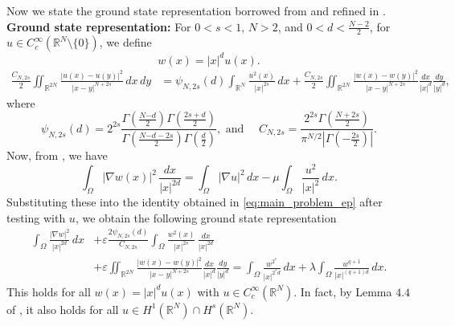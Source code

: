 \documentclass[11pt]{article}
\newcommand{\rtwon}{\mathbb{R}^{2N}}
\begin{document}
Now we state the ground state representation borrowed from \cite[Formula $(4.3)$]{frank2008hardy} and refined in \cite[Lemma $3.2$]{ghoussoub_fractional_hardy}.\\
\textbf{Ground state representation:} For $0 < s < 1$, $N > 2$, and $0 < d < \frac{N - 2}{2}$, for $u \in C_c^\infty(\mathbb{R}^N \setminus \{0\})$, we define
\begin{equation*}
    w(x) = |x|^{d} u(x).
\end{equation*}
\begin{equation*}
\begin{aligned}
    \frac{C_{N,2s}}{2} \iint_{\rtwon} \frac{|u(x) - u(y)|^2}{|x - y|^{N + 2s}} \,dx\,dy 
    &= \psi_{N,2s}(d) \int_{\mathbb{R}^N} \frac{u^2(x)}{|x|^{2s}} \,dx + \frac{C_{N,2s}}{2} \iint_{\rtwon} \frac{|w(x) - w(y)|^2}{|x - y|^{N + 2s}} \frac{dx}{|x|^{d}} \frac{dy}{|y|^{d}},
\end{aligned}
\end{equation*}
where
\begin{equation*}
    \psi_{N,2s}(d) = 2^{2s} \frac{
        \Gamma\left( \frac{N  {-d}}{2} \right) 
        \Gamma\left( \frac{2s +{d}}{2} \right)
    }{
        \Gamma\left( \frac{N  {-d} - 2s}{2} \right)
        \Gamma\left( \frac{d}{2} \right)
    }, \text{ and } \quad 
     C_{N,2s} = \frac{
        2^{2s} \Gamma\left( \frac{N + 2s}{2} \right)
    }{
        \pi^{N/2} \left| \Gamma\left( -\frac{2s}{2} \right) \right|
    }.
\end{equation*}
Now, from \cite{chen2004multiple}, we have
\begin{equation*}
    \int_{\Omega}  |\nabla w(x)|^2 \,\frac{dx}{|x|^{2 d}} = \int_{\Omega} |\nabla u|^2 \, dx - \mu \int_{\Omega} \frac{u^2}{|x|^2} \,dx.
\end{equation*}
Substituting these into the identity obtained in \eqref{eq:main_problem_ep} after testing with $u$, we obtain the following ground state representation
\begin{equation*}
\begin{aligned}
    \int_{\Omega}  \frac{|\nabla w|^2}{|x|^{2d}} \,dx 
    &+ \varepsilon\frac{2 \psi_{N,2s}(d)}{C_{N,2s}} \int_{\Omega} \frac{ w^2(x)}{|x|^{2s}} \,\frac{dx}{|x|^{2 d}} \\
    &+ \varepsilon\iint_{\mathbb{R}^{2N}} \frac{|w(x) - w(y)|^2}{|x - y|^{N + 2s}} \frac{dx}{|x|^{d}} \frac{dy}{|y|^{d}}
    = \int_{\Omega} \frac{ w^{2^*}}{|x|^{2^* d}} \,dx + \lambda \int_{\Omega}  \frac{w^{q+1}}{|x|^{(q+1) d}} \,dx.
\end{aligned}
\end{equation*}
This holds for all $w(x) = |x|^{d} u(x)$ with $u \in C_c^\infty(\mathbb{R}^N)$. In fact, by Lemma $4.4$ of \cite{dipierro2016fractionalwithHardy}, it also holds for all $u \in H^1(\mathbb{R}^N) \cap H^s(\mathbb{R}^N)$.\\
\end{document}
